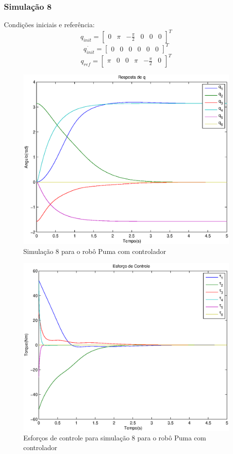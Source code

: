 \documentclass{article}
\begin{document}
\subsubsection{Simulação 8}
Condições iniciais e referência:
\begin{equation}
\label{eq:sim8q}
q_{init}=\begin{bmatrix}
0 & \pi & -\frac{\pi}{2} & 0 & 0 & 0
\end{bmatrix}^T
\end{equation}
\begin{equation}
\label{eq:sim8qd}
\dot{q_{init}}=\begin{bmatrix}
0 & 0 & 0 & 0 & 0 & 0
\end{bmatrix}^T
\end{equation}
\begin{equation}
\label{eq:sim8qr}
q_{ref}=\begin{bmatrix}
\pi & 0 & 0 & \pi & -\frac{\pi}{2} & 0
\end{bmatrix}^T
\end{equation}

\begin{figure}[H]
	\centering
	\includegraphics[width=0.8\linewidth]{../sim2cl}
	\caption{Simulação 8 para o robô Puma com controlador}
	\label{fig:pumasim8}
\end{figure}

\begin{figure}[H]
	\centering
	\includegraphics[width=0.8\linewidth]{../sim2clu}
	\caption{Esforços de controle para simulação 8 para o robô Puma com controlador}
	\label{fig:pumasim8clu}
\end{figure}
\end{document}
